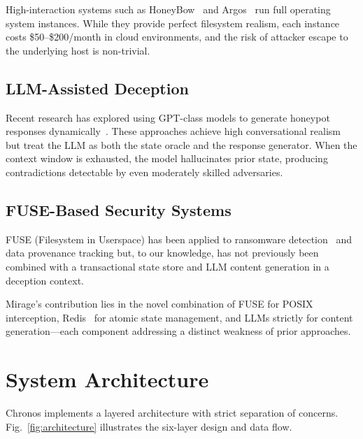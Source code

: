 \documentclass[conference]{IEEEtran}
\begin{document}
High-interaction systems such as HoneyBow~\cite{zhuge2007honeybow} and Argos~\cite{portokalidis2006argos} run full operating system instances.
While they provide perfect filesystem realism, each instance costs \$50--\$200/month in cloud environments, and the risk of attacker escape to the underlying host is non-trivial.

\subsection{LLM-Assisted Deception}

Recent research has explored using GPT-class models to generate honeypot responses dynamically~\cite{mckee2023chatbots}.
These approaches achieve high conversational realism but treat the LLM as both the state oracle and the response generator.
When the context window is exhausted, the model hallucinates prior state, producing contradictions detectable by even moderately skilled adversaries.

\subsection{FUSE-Based Security Systems}

FUSE (Filesystem in Userspace) has been applied to ransomware detection~\cite{continella2016shieldfs} and data provenance tracking but, to our knowledge, has not previously been combined with a transactional state store and LLM content generation in a deception context.

Mirage's contribution lies in the novel combination of FUSE for POSIX interception, Redis~\cite{redis2023lua} for atomic state management, and LLMs strictly for content generation---each component addressing a distinct weakness of prior approaches.

\section{System Architecture}
\label{sec:architecture}

Chronos implements a layered architecture with strict separation of concerns.
Fig.~\ref{fig:architecture} illustrates the six-layer design and data flow.
\end{document}
